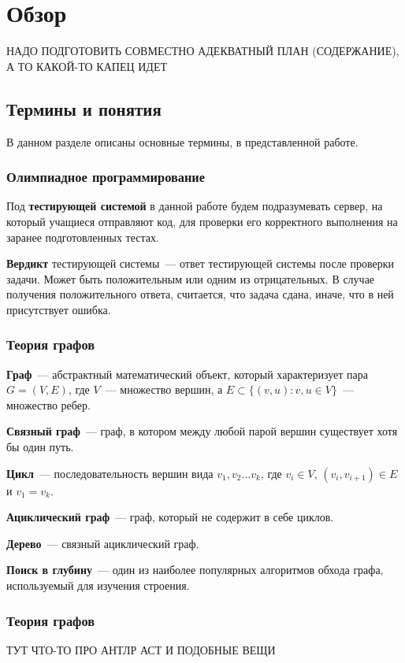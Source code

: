 \chapter{Обзор}

НАДО ПОДГОТОВИТЬ СОВМЕСТНО АДЕКВАТНЫЙ ПЛАН (СОДЕРЖАНИЕ), А ТО КАКОЙ-ТО КАПЕЦ ИДЕТ

\section{Термины и понятия}

В данном разделе описаны основные термины, в представленной работе.

\subsection{Олимпиадное программирование}

Под \textbf{тестирующей системой} в данной работе будем подразумевать сервер, на который учащиеся отправляют код, для проверки его
корректного выполнения на заранее подготовленных тестах.

\textbf{Вердикт} тестирующей системы~--- ответ тестирующей системы после проверки задачи. Может быть положительным или одним
из отрицательных. В случае получения положительного ответа, считается, что задача сдана, иначе, что в ней присутствует ошибка.

\subsection{Теория графов}

\textbf{Граф}~--- абстрактный математический объект, который характеризует 
пара $G = (V, E)$, где $V$~--- множество вершин, а $E \subset \{(v, u): v, u \in V\}$~--- множество ребер. 

\textbf{Связный граф}~--- граф, в котором между любой парой вершин существует хотя бы один путь.

\textbf{Цикл}~--- последовательность вершин вида $v_1, v_2 \dots v_k$, где $v_i \in V$, 
$(v_i, v_{i+1}) \in E$ и $v_1 = v_k$.

\textbf{Ациклический граф}~--- граф, который не содержит в себе циклов.

\textbf{Дерево}~--- связный ациклический граф.

\textbf{Поиск в глубину}~--- один из наиболее популярных алгоритмов обхода графа, используемый для изучения строения. 

\subsection{Теория графов}
ТУТ ЧТО-ТО ПРО АНТЛР АСТ И ПОДОБНЫЕ ВЕЩИ

